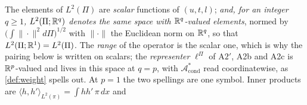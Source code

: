 \begin{definition}
The elements of $L^{2}(\Pi)$ are
\emph{scalar} functions of $(u,t,l)$; \emph{and, for an integer $q\ge1$, $L^{2}(\Pi;\mathbb{R}^{q})$ denotes the
same space with $\mathbb{R}^{q}$-valued elements}, normed by $\big(\int\|\cdot\|^{2}d\Pi\big)^{1/2}$ with
$\|\cdot\|$ the Euclidean norm on $\mathbb{R}^{q}$, so that $L^{2}(\Pi;\mathbb{R}^{1})=L^{2}(\Pi)$. The \emph{range} of
the operator is the scalar one, which is why the pairing below is written on scalars; the
\emph{representer} $\ell^\Pi$ of A$2'$, A2b and A2c is $\mathbb{R}^{p}$-valued and lives in this space at
$q=p$, with $\mathcal A^\ast_{\mathrm{cond}}$ read coordinatewise, as \cref{def:weight} spells out. At
$p=1$ the two spellings are one symbol.
Inner products are
$\langle h,h'\rangle_{L^2(\pi)}=\int hh'\,\pi\,dx$ and

\end{definition}
